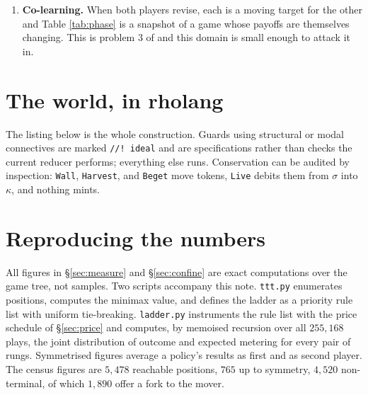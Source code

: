 \documentclass[11pt]{article}
\theoremstyle{definition}
\theoremstyle{plain}
\theoremstyle{remark}
\begin{document}
\begin{enumerate}
\item \textbf{Co-learning.} When both players revise, each is a moving target
for the other and Table \ref{tab:phase} is a snapshot of a game whose payoffs
are themselves changing. This is problem 3 of \cite{scientist} and this domain
is small enough to attack it in.
\end{enumerate}

\appendix

\section{The world, in rholang}\label{app:code}

The listing below is the whole construction. Guards using structural or modal
connectives are marked \texttt{//!\ ideal} and are specifications rather than
checks the current reducer performs; everything else runs. Conservation can be
audited by inspection: \texttt{Wall}, \texttt{Harvest}, and \texttt{Beget} move
tokens, \texttt{Live} debits them from $\sigma$ into $\kappa$, and nothing
mints.



\section{Reproducing the numbers}\label{app:repro}

All figures in \S\ref{sec:measure} and \S\ref{sec:confine} are exact
computations over the game tree, not samples. Two scripts accompany this note.
\texttt{ttt.py} enumerates positions, computes the minimax value, and defines
the ladder as a priority rule list with uniform tie-breaking.
\texttt{ladder.py} instruments the rule list with the price schedule of
\S\ref{sec:price} and computes, by memoised recursion over all $255{,}168$
plays, the joint distribution of outcome and expected metering for every pair of
rungs. Symmetrised figures average a policy's results as first and as second
player. The census figures are $5{,}478$ reachable positions, $765$ up to
symmetry, $4{,}520$ non-terminal, of which $1{,}890$ offer a fork to the mover.
\end{document}
